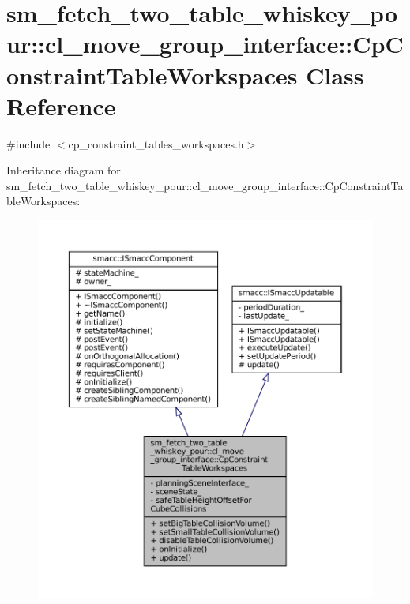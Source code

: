 \hypertarget{classsm__fetch__two__table__whiskey__pour_1_1cl__move__group__interface_1_1CpConstraintTableWorkspaces}{}\section{sm\+\_\+fetch\+\_\+two\+\_\+table\+\_\+whiskey\+\_\+pour\+:\+:cl\+\_\+move\+\_\+group\+\_\+interface\+:\+:Cp\+Constraint\+Table\+Workspaces Class Reference}
\label{classsm__fetch__two__table__whiskey__pour_1_1cl__move__group__interface_1_1CpConstraintTableWorkspaces}


{\ttfamily \#include $<$cp\+\_\+constraint\+\_\+tables\+\_\+workspaces.\+h$>$}



Inheritance diagram for sm\+\_\+fetch\+\_\+two\+\_\+table\+\_\+whiskey\+\_\+pour\+:\+:cl\+\_\+move\+\_\+group\+\_\+interface\+:\+:Cp\+Constraint\+Table\+Workspaces\+:
\nopagebreak
\begin{figure}[H]
\begin{center}
\leavevmode
\includegraphics[width=350pt]{classsm__fetch__two__table__whiskey__pour_1_1cl__move__group__interface_1_1CpConstraintTableWorkspaces__inherit__graph}
\end{center}
\end{figure}


